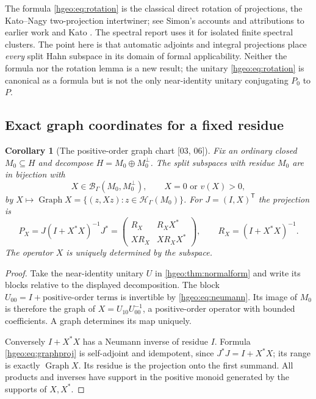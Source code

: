 \documentclass[11pt,letterpaper]{article}
\numberwithin{equation}{section}
\newtheorem{corollary}[corollary]{Corollary}
\theoremstyle{definition}
\theoremstyle{remark}
\newcommand{\HH}[1]{\mathscr H_\Gamma(#1)}
\newcommand{\BB}[2]{\mathscr B_\Gamma(#1,#2)}
\newcommand{\Graph}{\operatorname{Graph}}
\newcommand{\src}[1]{\textup{\textsf{\small[#1]}}}
\begin{document}
The formula \eqref{hgeo:eq:rotation} is the classical direct rotation of
projections, the Kato--Nagy two-projection intertwiner; see Simon's accounts
and attributions to earlier work \cite{Simon,SimonKato} and Kato
\cite{Kato}. The spectral report uses it for isolated finite spectral
clusters. The point here is that automatic adjoints and integral
projections place \emph{every} split Hahn subspace in its domain of formal
applicability. Neither the formula nor the rotation lemma is a new result;
the unitary \eqref{hgeo:eq:rotation} is canonical as a formula but is not the
only near-identity unitary conjugating $P_0$ to $P$.

\subsection{Exact graph coordinates for a fixed residue}

\begin{corollary}[The positive-order graph chart \src{03, 06}]
\label{hgeo:cor:graphchart}
Fix an ordinary closed $M_0\subseteq H$ and decompose
$H=M_0\oplus M_0^\perp$. The split subspaces with residue $M_0$ are in
bijection with
\[
 X\in\BB{M_0}{M_0^\perp},\qquad X=0\text{ or }v(X)>0,
\]
by $X\mapsto\Graph X=\{(z,Xz):z\in\HH{M_0}\}$. For $J=(I,X)^{\mathsf T}$ the
projection is
\begin{equation}\label{hgeo:eq:graphproj}
 P_X=J(I+X^*X)^{-1}J^*
 =\begin{pmatrix}R_X&R_XX^*\\XR_X&XR_XX^*\end{pmatrix},
 \qquad R_X=(I+X^*X)^{-1}.
\end{equation}
The operator $X$ is uniquely determined by the subspace.
\end{corollary}
\begin{proof}
Take the near-identity unitary $U$ in \cref{hgeo:thm:normalform}
and write its blocks relative to the displayed decomposition.
The block $U_{00}=I+\text{positive-order terms}$ is invertible by
\eqref{hgeo:eq:neumann}. Its image of $M_0$ is therefore the graph of
$X=U_{10}U_{00}^{-1}$, a positive-order operator with bounded
coefficients. A graph determines its map uniquely.

Conversely $I+X^*X$ has a Neumann inverse of residue $I$. Formula
\eqref{hgeo:eq:graphproj} is self-adjoint and idempotent, since
$J^*J=I+X^*X$; its range is exactly $\Graph X$. Its residue is the
projection onto the first summand. All products and inverses have
support in the positive monoid generated by the supports of $X,X^*$.
\end{proof}
\end{document}

